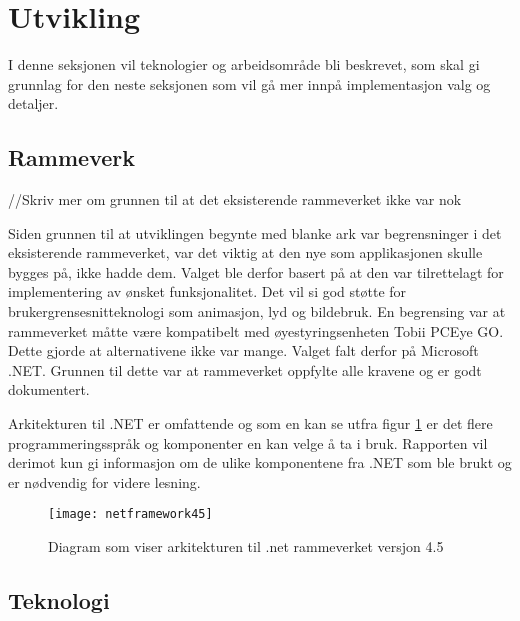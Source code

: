  
\section{Utvikling} 
 
 
I denne seksjonen vil teknologier og arbeidsområde bli beskrevet, som skal gi grunnlag for den neste seksjonen som vil gå mer innpå implementasjon valg og detaljer. 
 
 
\subsection{Rammeverk} //Skriv mer om  grunnen til at det eksisterende rammeverket ikke var nok 
 
 
Siden grunnen til at utviklingen begynte med blanke ark var begrensninger i det eksisterende rammeverket, var det viktig at den nye som applikasjonen skulle bygges på, ikke hadde dem. Valget ble derfor basert på at den var tilrettelagt for implementering av ønsket funksjonalitet. Det vil si god støtte for brukergrensesnitteknologi som animasjon, lyd og bildebruk. En begrensing var at rammeverket måtte være kompatibelt med øyestyringsenheten Tobii PCEye GO. Dette gjorde at alternativene ikke var mange.  
Valget falt derfor på Microsoft .NET. Grunnen til dette var at rammeverket oppfylte alle kravene og er godt dokumentert. 
 
 
Arkitekturen til .NET er omfattende og som en kan se utfra figur \ref{fig:net-arkitektur} er det flere programmeringsspråk og komponenter en kan velge å ta i bruk. Rapporten vil derimot kun gi informasjon om de ulike komponentene fra .NET som ble brukt og er nødvendig for videre lesning. 
 
 
\begin{figure}[ht] 
\centering 
\texttt{[image: netframework45]} 
\caption{Diagram som viser arkitekturen til .net rammeverket versjon 4.5} 
\label{fig:net-arkitektur} 
\end{figure} 
 
 
\subsection{Teknologi} 
 
